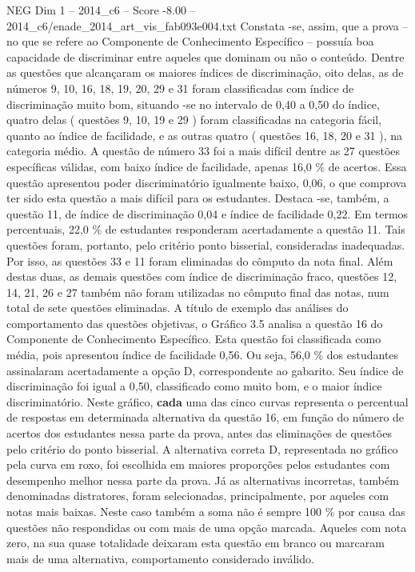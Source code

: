 \begin{textsample}{NEG Dim 1 – 2014\_c6 – Score -8.00 – 2014\_c6/enade\_2014\_art\_vis\_fab093e004.txt}
Constata -se, assim, que a prova – no que se refere ao Componente de Conhecimento Específico – possuía boa capacidade de discriminar entre aqueles que dominam ou não o conteúdo.
Dentre as questões que alcançaram os maiores índices de discriminação, oito delas, as de números 9, 10, 16, 18, 19, 20, 29 e 31 foram classificadas com índice de discriminação muito bom, situando -se no intervalo de 0,40 a 0,50 do índice, quatro delas ( questões 9, 10, 19 e 29 ) foram classificadas na categoria fácil, quanto ao índice de facilidade, e as outras quatro ( questões 16, 18, 20 e 31 ), na categoria médio.
A questão de número 33 foi a mais difícil dentre as 27 questões específicas válidas, com baixo índice de facilidade, apenas 16,0 \% de acertos.
Essa questão apresentou poder discriminatório igualmente baixo, 0,06, o que comprova ter sido esta questão a mais difícil para os estudantes.
Destaca -se, também, a questão 11, de índice de discriminação 0,04 e índice de facilidade 0,22.
Em termos percentuais, 22,0 \% de estudantes responderam acertadamente a questão 11.
Tais questões foram, portanto, pelo critério ponto bisserial, consideradas inadequadas.
Por isso, as questões 33 e 11 foram eliminadas do cômputo da nota final.
Além destas duas, as demais questões com índice de discriminação fraco, questões 12, 14, 21, 26 e 27 também não foram utilizadas no cômputo final das notas, num total de sete questões eliminadas.
A título de exemplo das análises do comportamento das questões objetivas, o Gráfico 3.5 analisa a questão 16 do Componente de Conhecimento Específico.
Esta questão foi classificada como média, pois apresentou índice de facilidade 0,56.
Ou seja, 56,0 \% dos estudantes assinalaram acertadamente a opção D, correspondente ao gabarito.
Seu índice de discriminação foi igual a 0,50, classificado como muito bom, e o maior índice discriminatório.
Neste gráfico, \textbf{cada} uma das cinco curvas representa o percentual de respostas em determinada alternativa da questão 16, em função do número de acertos dos estudantes nessa parte da prova, antes das eliminações de questões pelo critério do ponto bisserial.
A alternativa correta D, representada no gráfico pela curva em roxo, foi escolhida em maiores proporções pelos estudantes com desempenho melhor nessa parte da prova.
Já as alternativas incorretas, também denominadas distratores, foram selecionadas, principalmente, por aqueles com notas mais baixas.
Neste caso também a soma não é sempre 100 \% por causa das questões não respondidas ou com mais de uma opção marcada.
Aqueles com nota zero, na sua quase totalidade deixaram esta questão em branco ou marcaram mais de uma alternativa, comportamento considerado inválido.

\end{textsample}
